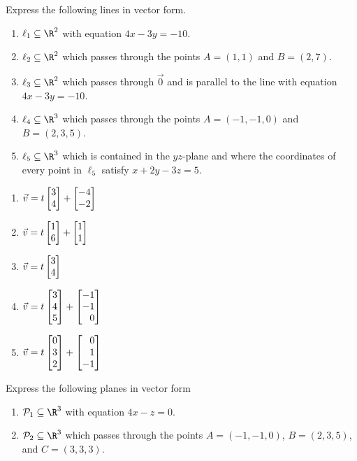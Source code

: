 \begin{exercises}
	\begin{problist}
		\prob  Express the following lines in vector form.
		\begin{enumerate}
			\item   $\ell_1\subseteq\R^2$ with equation $4x-3y=-10$. 
			\item   $\ell_2\subseteq\R^2$ which passes through the points $A=(1,1)$ and $B=(2,7)$.
			\item   $\ell_3\subseteq\R^2$ which passes through $\vec 0$ and is parallel to the line
				with equation $4x-3y=-10$.
			\item   $\ell_4\subseteq\R^3$ which passes through the points $A=(-1,-1,0)$ and $B=(2,3,5)$.
			\item   $\ell_5\subseteq\R^3$ which is contained in the $yz$-plane and where the coordinates
				of every point in $\ell_5$ satisfy $x+2y-3z=5$.
		\end{enumerate}
		\begin{solution}
    		\begin{enumerate}
    		    \item $\vec v = t\mat{3\\4} + \mat{-4\\-2} $
    		    \item $\vec v = t\mat{1\\6} + \mat{1\\1} $
    		    \item $\vec v = t\mat{3\\4}$
    		    \item $\vec v = t\mat{3\\4\\5} + \mat{-1\\-1 \\0}$
    		    \item $\vec v = t\mat{0\\3\\2} + \mat{0\\1\\-1}$
    		\end{enumerate}
		\end{solution}
		\prob Express the following planes in vector form
		\begin{enumerate}
			\item   $\mathcal P_1\subseteq\R^3$ with equation $4x-z=0$.
			\item   $\mathcal P_2\subseteq\R^3$ which passes through the points $A=(-1,-1,0)$, $B=(2,3,5)$, and $C=(3,3,3)$.

\end{enumerate}
\end{problist}
\end{exercises}
